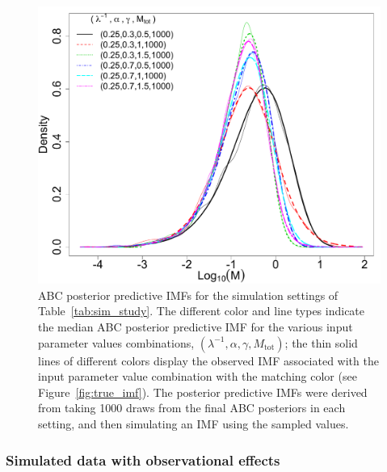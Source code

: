 \documentclass[ejs]{imsart}
\numberwithin{equation}{section}
\theoremstyle{plain}
\newcommand{\Mtot}{M_{\text{tot}}}
\begin{document}
\begin{figure}[htbp]
   \centering
\includegraphics[width = .5\textwidth]{figures/sim_study_imf_combined.pdf} 
   \caption{ABC posterior predictive IMFs for the simulation settings of Table~\ref{tab:sim_study}.  The different color and line types indicate the median ABC posterior predictive IMF for the various input parameter values combinations, $(\lambda^{-1}, \alpha, \gamma, \Mtot)$; the thin solid lines of different colors display the observed IMF associated with the input parameter value combination with the matching color (see Figure~\ref{fig:true_imf}).
The posterior predictive IMFs were derived from taking 1000 draws from the final ABC posteriors in each setting, and then simulating an IMF using the sampled values. 
   }
   \label{fig:abc_pa_imf}
\end{figure}





\subsubsection{Simulated data with observational effects} \label{sec:sim_obs}
\end{document}
